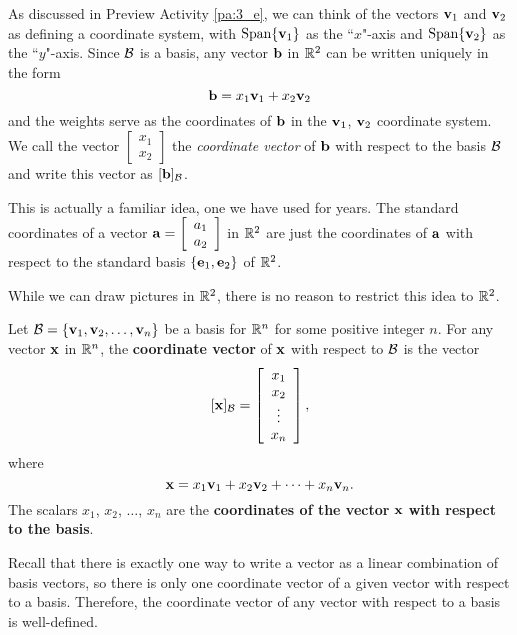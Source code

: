 As discussed in Preview Activity \ref{pa:3_e}, we can think of the vectors $\mathbf{v}_1$ and $\mathbf{v}_2$ as defining a coordinate system, with $\text{Span}\{\mathbf{v}_1\}$ as the ``$x$"-axis and $\text{Span}\{\mathbf{v}_2\}$ as the ``$y$"-axis. Since $\mathcal{B}$ is a basis, any vector $\mathbf{b}$ in $\mathbb{R}^2$ can be written uniquely in the form
\[\mathbf{b} = x_1 \mathbf{v}_1 + x_2 \mathbf{v}_2\]
and the weights serve as the coordinates of $\mathbf{b}$ in the $\mathbf{v}_1$, $\mathbf{v}_2$ coordinate system. We call the vector $\left[ \begin{array}{c} x_1 \\ x_2 \end{array} \right]$ the \emph{coordinate vector} of $\mathbf{b}$ with respect to the basis $\mathcal{B}$ and write this vector as $[\mathbf{b}]_{\mathcal{B}}$.

This is actually a familiar idea, one we have used for years. The standard coordinates of a vector $\mathbf{a} = \left[ \begin{array}{c} a_1 \\ a_2 \end{array} \right]$ in $\mathbb{R}^2$ are just the coordinates of $\mathbf{a}$ with respect to the standard basis $\{\mathbf{e}_1, \mathbf{e}_2\}$ of $\mathbb{R}^2$. 

While we can draw pictures in $\mathbb{R}^2$, there is no reason to restrict this idea to $\mathbb{R}^2$.



\begin{definition} Let $\mathcal{B} = \{\mathbf{v}_1, \mathbf{v}_2, \ldots, \mathbf{v}_n\}$ be a basis for $\mathbb{R}^n$ for some positive integer $n$. For any vector $\mathbf{x}$ in $\mathbb{R}^n$, the \textbf{coordinate vector} of $\mathbf{x}$ with respect to $\mathcal{B}$ is the vector
\[[\mathbf{x}]_{\mathcal{B}} = \left[ \begin{array}{c} x_1 \\ x_2 \\ \vdots \\ x_n \end{array} \right],\]
where
\[\mathbf{x} = x_1 \mathbf{v}_1 + x_2 \mathbf{v}_2 + \cdots + x_n \mathbf{v}_n.\]
The scalars $x_1$, $x_2$, $\ldots$, $x_n$ are the \textbf{coordinates of the vector} $\mathbf{x}$ \textbf{with respect to the basis}.  
\end{definition}

Recall that there is exactly one way to write a vector as a linear combination of basis vectors, so there is only one  coordinate vector of a given vector with respect to a basis. Therefore, the coordinate vector of any vector with respect to a basis is well-defined.

